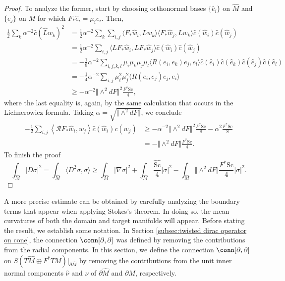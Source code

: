 \documentclass[12pt, reqno]{amsart}
\theoremstyle{plain} %
\theoremstyle{definition}
\theoremstyle{remark}
\numberwithin{equation}{section}
\newcommand{\dom}[1]{\hat{#1}}
\newcommand{\onorm}[1]{\Vert #1 \Vert}
\newcommand{\pnorm}[1]{| #1 |}
\newcommand{\bnd}[1]{\partial #1}
\newcommand{\Sc}{\mathrm{Sc}}
\begin{document}
\begin{proof}
    To analyze the former, start by choosing orthonormal bases \(\{\dom{e}_i\}\) on \(\dom{M}\) and \(\{e_j\}\) on \(M\) for which \(F_*\dom{e}_i=\mu_ie_i\).
    Then,
    \begin{equation*}
        \begin{aligned}
            \frac{1}{2}\sum_k\alpha^{-2}\dom{c}(\dom{L}w_k)^2&=\frac{1}{2}\alpha^{-2}\sum_k\sum_{i,j}\langle F_*\dom{w}_i,Lw_k\rangle\langle F_*\dom{w}_j,Lw_k\rangle\dom{c}(\dom{w}_i)\dom{c}(\dom{w}_j)\\
            &=\frac{1}{2}\alpha^{-2}\sum_{i,j}\langle LF_*\dom{w}_i,LF_*\dom{w}_j\rangle\dom{c}(\dom{w}_i)\dom{c}(\dom{w}_j)\\
            &=-\frac{1}{8}\alpha^{-2}\sum_{i,j,k,l}\mu_i\mu_k\mu_j\mu_l\langle R(e_i,e_k)e_j,e_l\rangle\dom{c}(\dom{e}_i)\dom{c}(\dom{e}_k)\dom{c}(\dom{e}_j)\dom{c}(\dom{e}_l)\\
            &=-\frac{1}{4}\alpha^{-2}\sum_{i,j}\mu_i^2\mu_j^2\langle R(e_i,e_j)e_j,e_i\rangle\\
            &\geq-\alpha^{-2}\onorm{\wedge^2dF}^2\frac{F^*\Sc}{4},
        \end{aligned}
    \end{equation*}
    where the last equality is, again, by the same calculation that occurs in the Lichnerowicz formula.
    Taking \(\alpha=\sqrt{\onorm{\wedge^2 dF}}\), we conclude
    \begin{equation*}
        \begin{aligned}
            -\frac{1}{2}\sum_{i,j}\left<\mathcal{R}F_*\dom{w}_i,w_j\right>\dom{c}(\dom{w}_i)c(w_j)&\geq-\alpha^{-2}\onorm{\wedge^2 dF}^2\frac{F^*\Sc}{8}-\alpha^2\frac{F^*\Sc}{8} \\
            &=-\onorm{\wedge^2 dF}\frac{F^*\Sc}{4}.
        \end{aligned}
    \end{equation*}
    To finish the proof
    \begin{equation*}
        \int_{\dom{M}}\pnorm{D\sigma}^2=\int_{\dom{M}}\langle D^2\sigma,\sigma\rangle\geq\int_{\dom{M}}\pnorm{\nabla \sigma}^2+\int_{\dom{M}}\frac{\dom{\Sc}}{4}\pnorm{\sigma}^2-\int_{\dom{M}}\onorm{\wedge^2 dF}\frac{F^*\Sc}{4}\pnorm{\sigma}^2.
    \end{equation*}
\end{proof}

A more precise estimate can be obtained by carefully analyzing the boundary terms that appear when applying Stokes's theorem.
In doing so, the mean curvatures of both the domain and target manifolds will appear.
Before stating the result, we establish some notation.
In Section \ref{subsec:twisted dirac operator on cone}, the connection \(\conn[\partial,\partial]\) was defined by removing the contributions from the radial components.
In this section, we define the connection \(\conn[\partial, \partial]\) on \(S(T\dom{M} \oplus F^*TM)|_{\bnd{\dom{M}}}\) by removing the contributions from the unit inner normal components \(\dom{\nu}\) and \(\nu\) of \(\bnd{\dom{M}}\) and \(\bnd{M}\), respectively.
\end{document}
